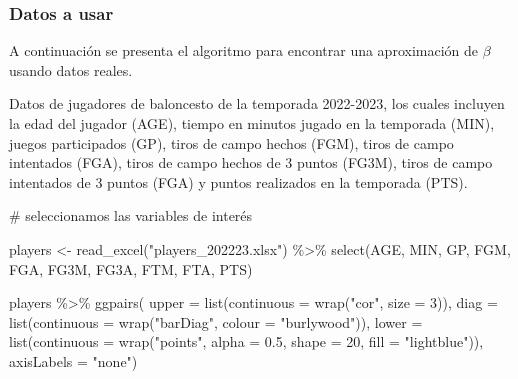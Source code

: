 \documentclass[
  letterpaper,
  DIV=11,
  numbers=noendperiod]{scrartcl}
\newenvironment{Shaded}{\begin{snugshade}}{\end{snugshade}}
\newcommand{\AttributeTok}[1]{\textcolor[rgb]{0.40,0.45,0.13}{#1}}
\newcommand{\CommentTok}[1]{\textcolor[rgb]{0.37,0.37,0.37}{#1}}
\newcommand{\DecValTok}[1]{\textcolor[rgb]{0.68,0.00,0.00}{#1}}
\newcommand{\FloatTok}[1]{\textcolor[rgb]{0.68,0.00,0.00}{#1}}
\newcommand{\FunctionTok}[1]{\textcolor[rgb]{0.28,0.35,0.67}{#1}}
\newcommand{\NormalTok}[1]{\textcolor[rgb]{0.00,0.23,0.31}{#1}}
\newcommand{\OtherTok}[1]{\textcolor[rgb]{0.00,0.23,0.31}{#1}}
\newcommand{\SpecialCharTok}[1]{\textcolor[rgb]{0.37,0.37,0.37}{#1}}
\newcommand{\StringTok}[1]{\textcolor[rgb]{0.13,0.47,0.30}{#1}}
\begin{document}
\subsubsection{Datos a usar}\label{datos-a-usar}

A continuación se presenta el algoritmo para encontrar una aproximación
de \(\beta\) usando datos reales.

Datos de jugadores de baloncesto de la temporada 2022-2023, los cuales
incluyen la edad del jugador (AGE), tiempo en minutos jugado en la
temporada (MIN), juegos participados (GP), tiros de campo hechos (FGM),
tiros de campo intentados (FGA), tiros de campo hechos de 3 puntos
(FG3M), tiros de campo intentados de 3 puntos (FGA) y puntos realizados
en la temporada (PTS).

\begin{Shaded}
\begin{Highlighting}[]
\CommentTok{\# seleccionamos las variables de interés}

\NormalTok{players }\OtherTok{\textless{}{-}} \FunctionTok{read\_excel}\NormalTok{(}\StringTok{"players\_202223.xlsx"}\NormalTok{) }\SpecialCharTok{\%\textgreater{}\%} 
  \FunctionTok{select}\NormalTok{(AGE, MIN, GP, FGM, FGA, FG3M, FG3A, FTM, FTA, PTS)}
\end{Highlighting}
\end{Shaded}

\begin{Shaded}
\begin{Highlighting}[]
\NormalTok{players }\SpecialCharTok{\%\textgreater{}\%}
  \FunctionTok{ggpairs}\NormalTok{(}
    \AttributeTok{upper =} \FunctionTok{list}\NormalTok{(}\AttributeTok{continuous =} \FunctionTok{wrap}\NormalTok{(}\StringTok{"cor"}\NormalTok{, }\AttributeTok{size =} \DecValTok{3}\NormalTok{)),}
    \AttributeTok{diag =} \FunctionTok{list}\NormalTok{(}\AttributeTok{continuous =} \FunctionTok{wrap}\NormalTok{(}\StringTok{"barDiag"}\NormalTok{, }\AttributeTok{colour =} \StringTok{"burlywood"}\NormalTok{)),}
    \AttributeTok{lower =} \FunctionTok{list}\NormalTok{(}\AttributeTok{continuous =} \FunctionTok{wrap}\NormalTok{(}\StringTok{"points"}\NormalTok{, }\AttributeTok{alpha =} \FloatTok{0.5}\NormalTok{, }\AttributeTok{shape =} \DecValTok{20}\NormalTok{, }
                                   \AttributeTok{fill =} \StringTok{"lightblue"}\NormalTok{)),}
    \AttributeTok{axisLabels =} \StringTok{"none"}\NormalTok{)}
\end{Highlighting}
\end{Shaded}
\end{document}
